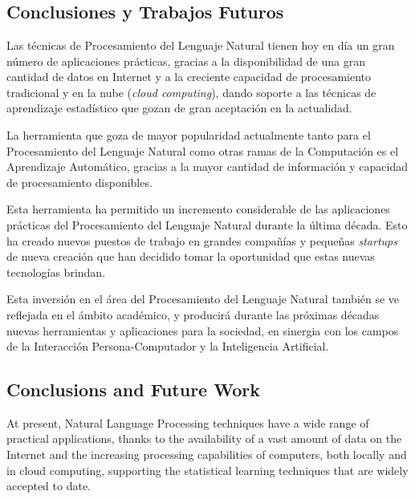 \chapter{\ChapterFour{}}
\lhead{\emph{\ChapterFour{}}}

\section{Conclusiones y Trabajos Futuros}

Las técnicas de Procesamiento del Lenguaje Natural tienen hoy en día un gran número de aplicaciones prácticas, gracias a la disponibilidad de una gran cantidad de datos en Internet y a la creciente capacidad de procesamiento tradicional y en la nube (\textit{cloud computing}), dando soporte a las técnicas de aprendizaje estadístico que gozan de gran aceptación en la actualidad.

La herramienta que goza de mayor popularidad actualmente tanto para el Procesamiento del Lenguaje Natural como otras ramas de la Computación es el Aprendizaje Automático, gracias a la mayor cantidad de información y capacidad de procesamiento disponibles.

Esta herramienta ha permitido un incremento considerable de las aplicaciones prácticas del Procesamiento del Lenguaje Natural durante la última década. Esto ha creado nuevos puestos de trabajo en grandes compañías y pequeñas \textit{startups} de nueva creación que han decidido tomar la oportunidad que estas nuevas tecnologías brindan.

Esta inversión en el área del Procesamiento del Lenguaje Natural también se ve reflejada en el ámbito académico, y producirá durante las próximas décadas nuevas herramientas y aplicaciones para la sociedad, en sinergia con los campos de la Interacción Persona-Computador y la Inteligencia Artificial.

\clearpage

\section{Conclusions and Future Work}

At present, Natural Language Processing techniques have a wide range of practical applications, thanks to the availability of a vast amount of data on the Internet and the increasing processing capabilities of computers, both locally and in cloud computing, supporting the statistical learning techniques that are widely accepted to date.

